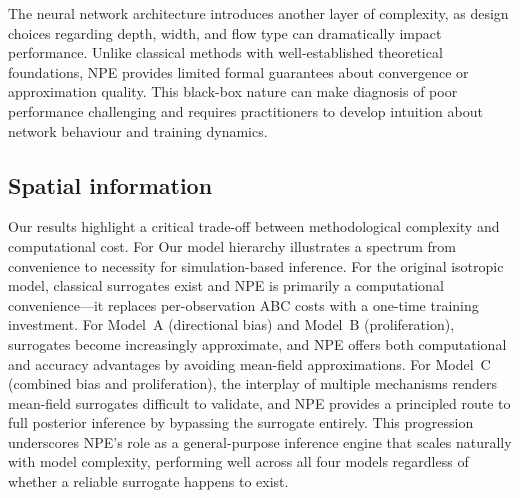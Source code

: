 \documentclass{article}
\providecommand{\DIFaddtex}[1]{{\protect\color{blue} \sf #1}} %
\providecommand{\DIFdeltex}[1]{{\protect\color{red} \scriptsize #1}} %
\providecommand{\DIFaddbegin}{} %
\providecommand{\DIFdelbegin}{} %
\providecommand{\DIFdelend}{} %
\providecommand{\DIFadd}[1]{\texorpdfstring{\DIFaddtex{#1}}{#1}} %
\providecommand{\DIFdel}[1]{\texorpdfstring{\DIFdeltex{#1}}{}} %
\newcommand{\DIFscaledelfig}{0.5}
\newlength{\DIFdelgraphicswidth} %
\newlength{\DIFdelgraphicsheight} %
\newcommand{\DIFaddincludegraphics}[2][]{{\color{blue}\fbox{\DIFOincludegraphics[#1]{#2}}}} %
\newcommand{\DIFdelincludegraphics}[2][]{%
\sbox{\DIFdelgraphicsbox}{\DIFOincludegraphics[#1]{#2}}%
\settoboxwidth{\DIFdelgraphicswidth}{\DIFdelgraphicsbox} %
\settoboxtotalheight{\DIFdelgraphicsheight}{\DIFdelgraphicsbox} %
\scalebox{\DIFscaledelfig}{%
\parbox[b]{\DIFdelgraphicswidth}{\usebox{\DIFdelgraphicsbox}\\[-\baselineskip] \rule{\DIFdelgraphicswidth}{0em}}\llap{\resizebox{\DIFdelgraphicswidth}{\DIFdelgraphicsheight}{%
\setlength{\unitlength}{\DIFdelgraphicswidth}%
\begin{picture}(1,1)%
\thicklines\linethickness{2pt} %
{\color[rgb]{1,0,0}\put(0,0){\framebox(1,1){}}}%
{\color[rgb]{1,0,0}\put(0,0){\line( 1,1){1}}}%
{\color[rgb]{1,0,0}\put(0,1){\line(1,-1){1}}}%
\end{picture}%
}\hspace*{3pt}}} %
} %
\DeclareRobustCommand{\DIFaddbegin}{\DIFOaddbegin \let\includegraphics\DIFaddincludegraphics} %
\DeclareRobustCommand{\DIFdelbegin}{\DIFOdelbegin \let\includegraphics\DIFdelincludegraphics} %
\DeclareRobustCommand{\DIFdelend}{\DIFOaddend \let\includegraphics\DIFOincludegraphics} %
\begin{document}
The neural network architecture introduces another layer of complexity, as design choices regarding depth, width, and flow type can dramatically impact performance. Unlike classical methods with well-established theoretical foundations, NPE provides limited formal guarantees about convergence or approximation quality. This black-box nature can make diagnosis of poor performance challenging and requires practitioners to develop intuition about network behaviour and training dynamics.

\DIFdelbegin \subsection{\DIFdel{Spatial information}}
\addtocounter{subsection}{-1}%
\DIFdel{Our results highlight a critical trade-off between methodological complexity and computational cost. For }\DIFdelend \DIFaddbegin \DIFadd{Our model hierarchy illustrates a spectrum from convenience to necessity for simulation-based inference. For the original isotropic model, classical surrogates exist and NPE is primarily a computational convenience---it replaces per-observation ABC costs with a one-time training investment. For Model~A (directional bias) and Model~B (proliferation), surrogates become increasingly approximate, and NPE offers both computational and accuracy advantages by avoiding mean-field approximations. For Model~C (combined bias and proliferation), the interplay of multiple mechanisms renders mean-field surrogates difficult to validate, and NPE provides a principled route to full posterior inference by bypassing the surrogate entirely. This progression underscores NPE's role as a general-purpose inference engine that scales naturally with model complexity, performing well across all four models regardless of whether a reliable surrogate happens to exist.
}
\end{document}
